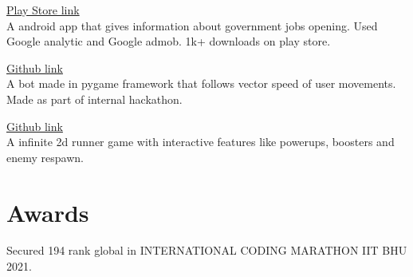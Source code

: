 \documentclass[]{deedy-resume-openfont}
\begin{document}
\begin{minipage}[t]{0.69\textwidth}
\hfill \href{https://play.google.com/store/apps/details?id=com.amostrone.akash.sanjeevwebsolutions}{Play Store link}\\
A android app that gives information about government jobs opening. Used Google analytic and Google admob. 1k+ downloads on play store.\\
\sectionsep

\hfill \href{https://github.com/jaiakash/spiddysense2021\_Akash}{Github link}\\
A bot made in pygame framework that follows vector speed of user movements. Made as part of internal hackathon.\\
\sectionsep
  

\hfill \href{https://github.com/jaiakash/NinjaVsSal}{Github link}\\
A infinite 2d runner game with interactive features like powerups, boosters and enemy respawn.\\
\sectionsep


%
%
\section{Awards}
 
Secured 194 rank global in INTERNATIONAL CODING MARATHON IIT BHU 2021.\\
 

 

 

 

\sectionsep
\end{minipage} 
\ 
\end{document}
